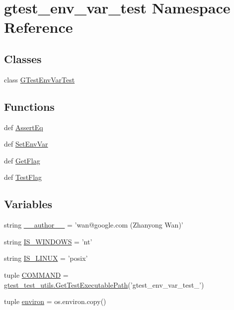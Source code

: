 \hypertarget{namespacegtest__env__var__test}{\section{gtest\-\_\-env\-\_\-var\-\_\-test Namespace Reference}
\label{namespacegtest__env__var__test}
}
\subsection*{Classes}
\begin{DoxyCompactItemize}
\item 
class \hyperlink{classgtest__env__var__test_1_1_g_test_env_var_test}{G\-Test\-Env\-Var\-Test}
\end{DoxyCompactItemize}
\subsection*{Functions}
\begin{DoxyCompactItemize}
\item 
def \hyperlink{namespacegtest__env__var__test_ad6332ca66e182fdc026b4a3320bfd5df}{Assert\-Eq}
\item 
def \hyperlink{namespacegtest__env__var__test_a6956c1471ed7a2d803a08e1b9f37fe24}{Set\-Env\-Var}
\item 
def \hyperlink{namespacegtest__env__var__test_ac0d1280b0a5b157b0cb13644bf8677d9}{Get\-Flag}
\item 
def \hyperlink{namespacegtest__env__var__test_af47985ae8c318065aede1d1b303cd6a8}{Test\-Flag}
\end{DoxyCompactItemize}
\subsection*{Variables}
\begin{DoxyCompactItemize}
\item 
string \hyperlink{namespacegtest__env__var__test_a8a712438470c76f2144c66dcee28e326}{\-\_\-\-\_\-author\-\_\-\-\_\-} = 'wan@google.\-com (Zhanyong Wan)'
\item 
string \hyperlink{namespacegtest__env__var__test_af792d1403a09d46bffcd3466821cd0fb}{I\-S\-\_\-\-W\-I\-N\-D\-O\-W\-S} = 'nt'
\item 
string \hyperlink{namespacegtest__env__var__test_a33b1e2e9afe9d59d75503de4a1297486}{I\-S\-\_\-\-L\-I\-N\-U\-X} = 'posix'
\item 
tuple \hyperlink{namespacegtest__env__var__test_a6c739e8ac3f4f184d9351af775d26496}{C\-O\-M\-M\-A\-N\-D} = \hyperlink{namespacegtest__test__utils_a1bdf3cac86afa675ed37629b183048e9}{gtest\-\_\-test\-\_\-utils.\-Get\-Test\-Executable\-Path}('gtest\-\_\-env\-\_\-var\-\_\-test\-\_\-')
\item 
tuple \hyperlink{namespacegtest__env__var__test_a5cfdb73835d2006b40151861d9fd1e7c}{environ} = os.\-environ.\-copy()
\end{DoxyCompactItemize}


